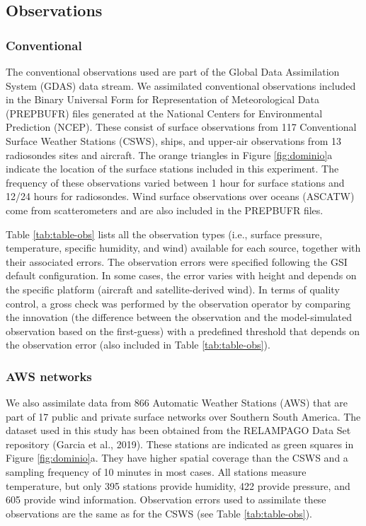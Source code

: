 \documentclass[authoryear,preprint,review,12pt]{elsarticle} %
\begin{document}
\hypertarget{observations}{%
\subsection{Observations}\label{observations}}

\hypertarget{conventional}{%
\subsubsection{Conventional}\label{conventional}}

The conventional observations used are part of the Global Data Assimilation System (GDAS) data stream. We assimilated conventional observations included in the Binary Universal Form for Representation of Meteorological Data (PREPBUFR) files generated at the National Centers for Environmental Prediction (NCEP). These consist of surface observations from 117 Conventional Surface Weather Stations (CSWS), ships, and upper-air observations from 13 radiosondes sites and aircraft. The orange triangles in Figure \ref{fig:dominio}a indicate the location of the surface stations included in this experiment. The frequency of these observations varied between 1 hour for surface stations and 12/24 hours for radiosondes. Wind surface observations over oceans (ASCATW) come from scatterometers and are also included in the PREPBUFR files.

Table \ref{tab:table-obs} lists all the observation types (i.e., surface pressure, temperature, specific humidity, and wind) available for each source, together with their associated errors. The observation errors were specified following the GSI default configuration. In some cases, the error varies with height and depends on the specific platform (aircraft and satellite-derived wind). In terms of quality control, a gross check was performed by the observation operator by comparing the innovation (the difference between the observation and the model-simulated observation based on the first-guess) with a predefined threshold that depends on the observation error (also included in Table \ref{tab:table-obs}).

\hypertarget{aws-networks}{%
\subsubsection{AWS networks}\label{aws-networks}}

We also assimilate data from 866 Automatic Weather Stations (AWS) that are part of 17 public and private surface networks over Southern South America. The dataset used in this study has been obtained from the RELAMPAGO Data Set repository (Garcia et al., 2019). These stations are indicated as green squares in Figure \ref{fig:dominio}a. They have higher spatial coverage than the CSWS and a sampling frequency of 10 minutes in most cases. All stations measure temperature, but only 395 stations provide humidity, 422 provide pressure, and 605 provide wind information.
Observation errors used to assimilate these observations are the same as for the CSWS (see Table \ref{tab:table-obs}).
\end{document}
